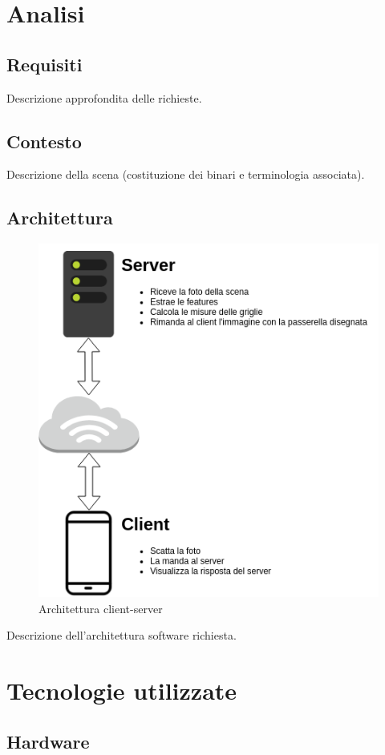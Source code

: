 \documentclass[twoside]{supsistudent}
\begin{document}
\newpage
\chapter{Analisi}
\section{Requisiti}
Descrizione approfondita delle richieste.
\section{Contesto}
Descrizione della scena (costituzione dei binari e terminologia associata). 
\section{Architettura}
\begin{figure}[H]
  \center
  \includegraphics[scale=0.6]{images/Architettura.png}
  \caption{Architettura client-server}
\end{figure}
Descrizione dell'architettura software richiesta.
\chapter{Tecnologie utilizzate}
\section{Hardware}
\end{document}
